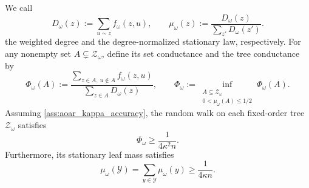 \documentclass{article}
\numberwithin{theorem}{section}
\numberwithin{proposition}{section}
\numberwithin{corollary}{section}
\numberwithin{lemma}{section}
\numberwithin{conjecture}{section}
\numberwithin{remark}{section}
\numberwithin{definition}{section}
\numberwithin{assumption}{section}
\numberwithin{example}{section}
\newcommand{\calY}{{\mathcal{Y}}}
\newcommand{\calZ}{{\mathcal{Z}}}
\begin{document}
\begin{lemma}
\label{lem:fixed_order_conductance}
We call
\begin{equation*}
    D_\omega(z):=\sum_{u\sim z}f_\omega(z,u), \qquad
    \mu_\omega(z):=\frac{D_\omega(z)}{\sum_{z'}D_\omega(z')}.
\end{equation*}
the weighted degree and the degree-normalized stationary law, respectively. For any nonempty set $A\subsetneq\calZ_\omega$, define its set conductance and the tree conductance by
\begin{equation*}
    \Phi_\omega(A):=\frac{\sum_{z\in A,\ u\notin A}f_\omega(z,u)}{\sum_{z\in A}D_\omega(z)}, \qquad
    \Phi_\omega:=\inf_{\substack{A\subseteq\calZ_\omega\\0<\mu_\omega(A)\le 1/2}}\Phi_\omega(A).
\end{equation*}
Assuming \cref{ass:aoar_kappa_accuracy}, the random walk on each fixed-order tree $\calZ_\omega$ satisfies
\begin{equation*}
    \Phi_\omega \ge \frac{1}{4\kappa^2 n}.
\end{equation*}
Furthermore, its stationary leaf mass satisfies
\begin{equation*}
    \mu_\omega(\calY) = \sum_{y\in\calY}\mu_\omega(y) \ge \frac{1}{4\kappa n}.
\end{equation*}
\end{lemma}
\end{document}
